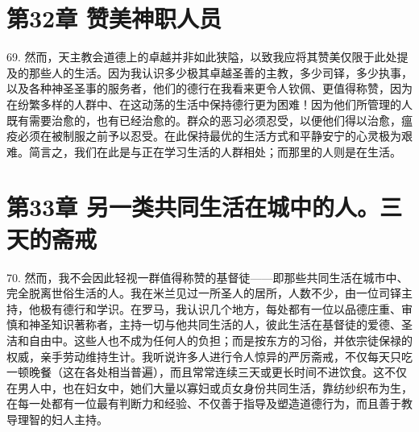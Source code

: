 
\section{第32章 赞美神职人员}

69. 然而，天主教会道德上的卓越并非如此狭隘，以致我应将其赞美仅限于此处提及的那些人的生活。因为我认识多少极其卓越圣善的主教，多少司铎，多少执事，以及各种神圣圣事的服务者，他们的德行在我看来更令人钦佩、更值得称赞，因为在纷繁多样的人群中、在这动荡的生活中保持德行更为困难！因为他们所管理的人既有需要治愈的，也有已经治愈的。群众的恶习必须忍受，以便他们得以治愈，瘟疫必须在被制服之前予以忍受。在此保持最优的生活方式和平静安宁的心灵极为艰难。简言之，我们在此是与正在学习生活的人群相处；而那里的人则是在生活。\par


\section{第33章 另一类共同生活在城中的人。三天的斋戒}

70. 然而，我不会因此轻视一群值得称赞的基督徒——即那些共同生活在城市中、完全脱离世俗生活的人。我在米兰见过一所圣人的居所，人数不少，由一位司铎主持，他极有德行和学识。在罗马，我认识几个地方，每处都有一位以品德庄重、审慎和神圣知识著称者，主持一切与他共同生活的人，彼此生活在基督徒的爱德、圣洁和自由中。这些人也不成为任何人的负担；而是按东方的习俗，并依宗徒保禄的权威，亲手劳动维持生计。我听说许多人进行令人惊异的严厉斋戒，不仅每天只吃一顿晚餐（这在各处相当普遍），而且常常连续三天或更长时间不进饮食。这不仅在男人中，也在妇女中，她们大量以寡妇或贞女身份共同生活，靠纺纱织布为生，在每一处都有一位最有判断力和经验、不仅善于指导及塑造道德行为，而且善于教导理智的妇人主持。\par

